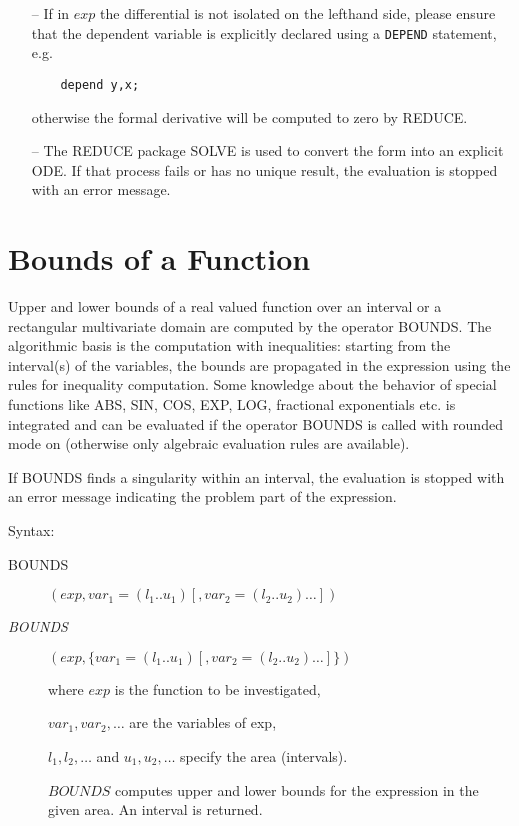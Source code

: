 \begin{enumerate}

\item[--] If in $exp$ the differential is not isolated on the lefthand side,
please ensure that the dependent variable is explicitly declared
using a \verb+DEPEND+ statement, e.g.

\begin{verbatim}
    depend y,x;
\end{verbatim}

otherwise the formal derivative will be computed to zero by REDUCE.

\item[--] The REDUCE package SOLVE is used to convert the form into
an explicit ODE. If that process fails or has no unique result,
the evaluation is stopped with an error message.

\end{enumerate}

\section{Bounds of a Function}

Upper and lower bounds of a real valued function over an
interval or a rectangular multivariate domain are computed
by the operator BOUNDS. The algorithmic basis is the computation
with inequalities: starting from the interval(s) of the
variables, the bounds are propagated in the expression
using the rules for inequality computation. Some knowledge
about the behavior of special functions like ABS, SIN, COS, EXP, LOG,
fractional exponentials etc. is integrated and can be evaluated
if the operator BOUNDS is called with rounded mode on
(otherwise only algebraic evaluation rules are available).

If BOUNDS finds a singularity within an interval, the evaluation
is stopped with an error message indicating the problem part
of the expression.

Syntax:


\begin{description}
\item[BOUNDS]$(exp,var_1=(l_1 .. u_1) [,var_2=(l_2 .. u_2) \ldots])$

\item[{\it BOUNDS}]$(exp,\{var_1=(l_1 .. u_1) [,var_2=(l_2 .. u_2)\ldots]\})$

where $exp$ is the function to be investigated,

$var_1, var_2 , \ldots$ are the variables of exp,

$l_1, l_2 , \ldots$  and  $u_1, u_2 , \ldots$ specify the area (intervals).

$BOUNDS$ computes upper and lower bounds for the expression in the
given area. An interval is returned.

\end{description}

